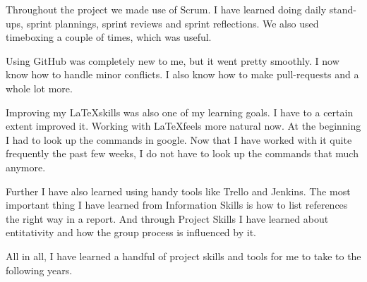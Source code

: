 \documentclass{article}
\begin{document}
\begin{enumerate}
Throughout the project we made use of Scrum. I have learned doing daily stand-ups, sprint plannings, sprint reviews and sprint reflections. We also used timeboxing a couple of times, which was useful. 

Using GitHub was completely new to me, but it went pretty smoothly. I now know how to handle minor conflicts. I also know how to make pull-requests and a whole lot more.

Improving my \LaTeX skills was also one of my learning goals. I have to a certain extent improved it. Working with \LaTeX feels more natural now. At the beginning I had to look up the commands in google. Now that I have worked with it quite frequently the past few weeks, I do not have to look up the commands that much anymore.

Further I have also learned using handy tools like Trello and Jenkins. The most important thing I have learned from Information Skills is how to list references the right way in a report. And through Project Skills I have learned about entitativity and how the group process is influenced by it. 

All in all, I have learned a handful of project skills and tools for me to take to the following years.


\end{enumerate}
\end{document}
